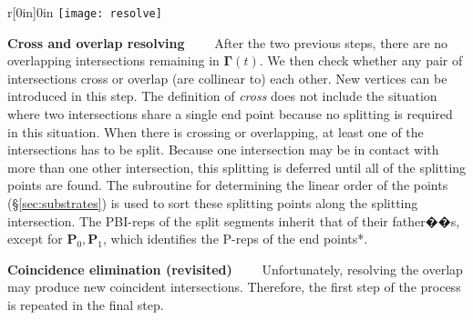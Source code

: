 \vspace{0.5em}
\begin{wrapfigure}{r}[0in]{0in}
\texttt{[image: resolve]}
\end{wrapfigure}
\noindent\textbf{Cross and overlap resolving}~~~~
After the two previous steps, there are no overlapping intersections remaining in $\bm{\Gamma}(t)$. We then check whether any pair of intersections cross or overlap (are collinear to) each other. New vertices can be introduced in this step. The definition of \emph{cross} does not include the situation where two intersections share a single end point because no splitting is required in this situation. When there is crossing or overlapping, at least one of the intersections has to be split. Because one intersection may be in contact with more than one other intersection, this splitting is deferred until all of the splitting points are found. The subroutine for determining the linear order of the points (\S\ref{sec:substrates}) is used to sort these splitting points along the splitting intersection. The PBI-reps of the split segments inherit that of their father��s, except for $\bm{P}_0, \bm{P}_1$, which identifies the P-reps of the end points*.

\vspace{0.5em}
\noindent \textbf{Coincidence elimination (revisited)}~~~~
Unfortunately, resolving the overlap may produce new coincident intersections. Therefore, the first step of the process is repeated in the final step.

